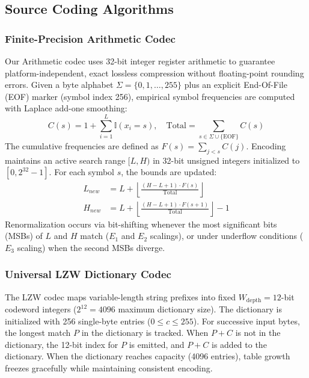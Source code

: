 \documentclass[conference]{IEEEtran}
\begin{document}
\subsection{Source Coding Algorithms}

\subsubsection{Finite-Precision Arithmetic Codec}
Our Arithmetic codec uses 32-bit integer register arithmetic to guarantee platform-independent, exact lossless compression without floating-point rounding errors. Given a byte alphabet $\Sigma = \{0, 1, \dots, 255\}$ plus an explicit End-Of-File (EOF) marker (symbol index 256), empirical symbol frequencies are computed with Laplace add-one smoothing:
\begin{equation}
C(s) = 1 + \sum_{i=1}^L \mathbb{I}(x_i = s), \quad \text{Total} = \sum_{s \in \Sigma \cup \{\text{EOF}\}} C(s)
\end{equation}
The cumulative frequencies are defined as $F(s) = \sum_{j < s} C(j)$. Encoding maintains an active search range $[L, H)$ in 32-bit unsigned integers initialized to $[0, 2^{32}-1]$. For each symbol $s$, the bounds are updated:
\begin{align}
L_{new} &= L + \left\lfloor \frac{(H - L + 1) \cdot F(s)}{\text{Total}} \right\rfloor \\
H_{new} &= L + \left\lfloor \frac{(H - L + 1) \cdot F(s+1)}{\text{Total}} \right\rfloor - 1
\end{align}
Renormalization occurs via bit-shifting whenever the most significant bits (MSBs) of $L$ and $H$ match ($E_1$ and $E_2$ scalings), or under underflow conditions ($E_3$ scaling) when the second MSBs diverge.

\subsubsection{Universal LZW Dictionary Codec}
The LZW codec maps variable-length string prefixes into fixed $W_{\text{depth}} = 12$-bit codeword integers ($2^{12} = 4096$ maximum dictionary size). The dictionary is initialized with 256 single-byte entries ($0 \le c \le 255$). For successive input bytes, the longest match $P$ in the dictionary is tracked. When $P + C$ is not in the dictionary, the 12-bit index for $P$ is emitted, and $P + C$ is added to the dictionary. When the dictionary reaches capacity (4096 entries), table growth freezes gracefully while maintaining consistent encoding.
\end{document}
